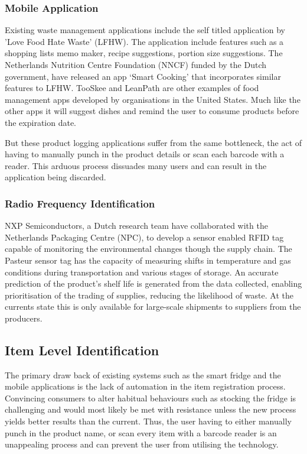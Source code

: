 \documentclass[a4paper, 11pt]{article}
\begin{document}
\subsubsection{Mobile Application} 
Existing waste management applications include the self titled application by 'Love Food Hate Waste' (LFHW). The application include features such as a shopping lists memo maker, recipe suggestions, portion size suggestions. The Netherlands Nutrition Centre Foundation (NNCF) funded by the Dutch government, have released an app `Smart Cooking' that incorporates similar features to LFHW. TooSkee and LeanPath\cite{FoodWaste} are other examples of food management apps developed by organisations in the United States. Much like the other apps it will suggest dishes and remind the user to consume products before the expiration date.\cite{FoodWaste} 

But these product logging applications suffer from the same bottleneck, the act of having to manually punch in the product details or scan each barcode with a reader. This arduous process dissuades many users and can result in the application being discarded. 

\subsubsection{Radio Frequency Identification} 
NXP Semiconductors, a Dutch research team have collaborated with the Netherlands Packaging Centre (NPC),  to develop a sensor enabled RFID tag capable of monitoring the environmental changes though the supply chain. \cite{rfidFood} The Pasteur sensor tag has the capacity of measuring shifts in temperature and gas conditions during transportation and various stages of storage. An accurate prediction of the product's shelf life is generated from the data collected, enabling prioritisation of the trading of supplies, reducing the likelihood of waste. At the currents state this is only available for large-scale shipments to suppliers from the producers.

\subsection{Item Level Identification}
The primary draw back of existing systems such as the smart fridge and the mobile applications is the lack of automation in the item registration process. Convincing consumers to alter habitual behaviours such as stocking the fridge is challenging and would most likely be met with resistance unless the new process yields better results than the current. Thus, the user having to either manually punch in the product name, or scan every item with a barcode reader is an unappealing process and can prevent the user from utilising the technology. 
\end{document}
